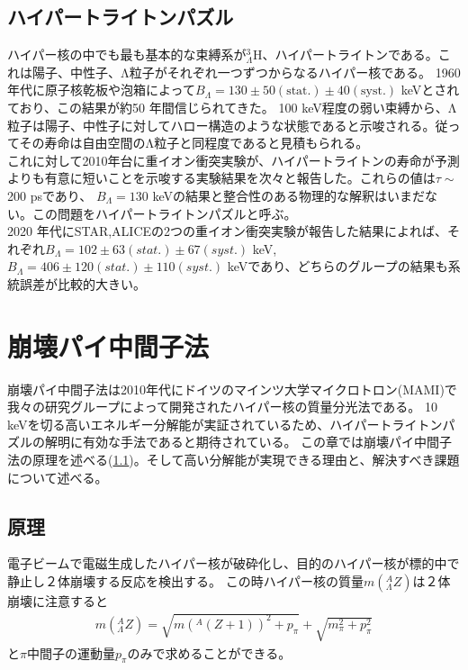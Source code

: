 \documentclass[a4paper,11pt,uplatex]{jsbook}
\begin{document}
\subsection{ハイパートライトンパズル}\label{sec:hypertriton puzzle}
ハイパー核の中でも最も基本的な束縛系が$^3_{\Lambda}\text{H}$、ハイパートライトンである。これは陽子、中性子、Λ粒子がそれぞれ一つずつからなるハイパー核である。
1960年代に原子核乾板や泡箱によって$B_{\Lambda} = 130 \pm 50(\text{stat.}) \pm 40(\text{syst.})$ keVとされており、この結果が約50 年間信じられてきた。
100 keV程度の弱い束縛から、Λ粒子は陽子、中性子に対してハロー構造のような状態であると示唆される。従ってその寿命は自由空間のΛ粒子と同程度であると見積もられる。\\
これに対して2010年台に重イオン衝突実験が、ハイパートライトンの寿命が予測よりも有意に短いことを示唆する実験結果を次々と報告した。これらの値は$\tau \sim$200 psであり、
$B_{\Lambda} = 130$ keVの結果と整合性のある物理的な解釈はいまだない。この問題をハイパートライトンパズルと呼ぶ。\\
2020 年代にSTAR,ALICEの2つの重イオン衝突実験が報告した結果によれば、それぞれ$B_{\Lambda}= 102 \pm 63(stat.) \pm 67(syst.)$ keV, 
$B_{\Lambda} = 406 \pm 120(stat.) \pm 110 (syst.)$ keVであり、どちらのグループの結果も系統誤差が比較的大きい。\\

\section{崩壊パイ中間子法}
崩壊パイ中間子法は2010年代にドイツのマインツ大学マイクロトロン(MAMI)で我々の研究グループによって開発されたハイパー核の質量分光法である\cite{esserObservation4Hyperhydrogen2015}。
10 keVを切る高いエネルギー分解能が実証されているため、ハイパートライトンパズルの解明に有効な手法であると期待されている。
この章では崩壊パイ中間子法の原理を述べる(\ref{sec:dps principle})。そして高い分解能が実現できる理由と、解決すべき課題について述べる。
\subsection{原理}\label{sec:dps principle}
電子ビームで電磁生成したハイパー核が破砕化し、目的のハイパー核が標的中で静止し２体崩壊する反応を検出する。
この時ハイパー核の質量$m(^A_{\Lambda}Z)$は２体崩壊に注意すると
\begin{eqnarray}
  m(^A_{\Lambda}Z) = \sqrt{m(^A(Z+1))^2 + p_\pi} + \sqrt{m_\pi^2 + p_\pi^2} \label{mass formula}
\end{eqnarray}
と$\pi$中間子の運動量$p_\pi$のみで求めることができる。
\end{document}
